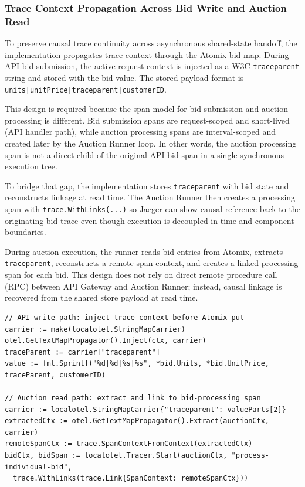 \subsubsection{Trace Context Propagation Across Bid Write and Auction Read}

To preserve causal trace continuity across asynchronous shared-state handoff, the implementation propagates trace context through the Atomix bid map. During API bid submission, the active request context is injected as a W3C \texttt{traceparent} string and stored with the bid value. The stored payload format is \texttt{units|unitPrice|traceparent|customerID}.

This design is required because the span model for bid submission and auction processing is different. Bid submission spans are request-scoped and short-lived (API handler path), while auction processing spans are interval-scoped and created later by the Auction Runner loop. In other words, the auction processing span is not a direct child of the original API bid span in a single synchronous execution tree.

To bridge that gap, the implementation stores \texttt{traceparent} with bid state and reconstructs linkage at read time. The Auction Runner then creates a processing span with \texttt{trace.WithLinks(...)} so Jaeger can show causal reference back to the originating bid trace even though execution is decoupled in time and component boundaries.

During auction execution, the runner reads bid entries from Atomix, extracts \texttt{traceparent}, reconstructs a remote span context, and creates a linked processing span for each bid. This design does not rely on direct remote procedure call (RPC) between API Gateway and Auction Runner; instead, causal linkage is recovered from the shared store payload at read time.

\begin{verbatim}
// API write path: inject trace context before Atomix put
carrier := make(localotel.StringMapCarrier)
otel.GetTextMapPropagator().Inject(ctx, carrier)
traceParent := carrier["traceparent"]
value := fmt.Sprintf("%d|%d|%s|%s", *bid.Units, *bid.UnitPrice, traceParent, customerID)

// Auction read path: extract and link to bid-processing span
carrier := localotel.StringMapCarrier{"traceparent": valueParts[2]}
extractedCtx := otel.GetTextMapPropagator().Extract(auctionCtx, carrier)
remoteSpanCtx := trace.SpanContextFromContext(extractedCtx)
bidCtx, bidSpan := localotel.Tracer.Start(auctionCtx, "process-individual-bid",
  trace.WithLinks(trace.Link{SpanContext: remoteSpanCtx}))
\end{verbatim}

